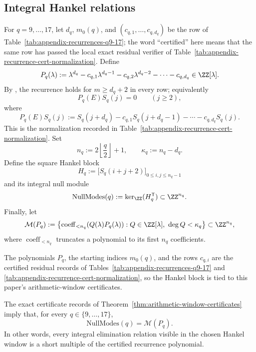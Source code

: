 \subsection{Integral Hankel relations}

\begin{definition}
\label{def:resonance-polynomials}
For \(q=9,\dots,17\), let \(d_q\), \(m_0(q)\), and
\((c_{q,1},\dots,c_{q,d_q})\) be the row of
Table~\ref{tab:appendix-recurrences-q9-17}; the word ``certified'' here means
that the same row has passed the local exact residual verifier of
Table~\ref{tab:appendix-recurrence-cert-normalization}.  Define
\[
  P_q(\lambda):=
  \lambda^{d_q}
  -c_{q,1}\lambda^{d_q-1}
  -c_{q,2}\lambda^{d_q-2}
  -\cdots
  -c_{q,d_q}\in\ZZ[\lambda].
\]
By , the recurrence holds for
\(m\ge d_q+2\) in every row; equivalently
\[
  P_q(E)S_q(j)=0\qquad(j\ge2),
\]
where
\[
  P_q(E)S_q(j):=
  S_q(j+d_q)-c_{q,1}S_q(j+d_q-1)-\cdots-c_{q,d_q}S_q(j).
\]
This is the normalization recorded in
Table~\ref{tab:appendix-recurrence-cert-normalization}.  Set
\[
  n_q:=2\left\lfloor\frac{q}{2}\right\rfloor+1,
  \qquad
  \kappa_q:=n_q-d_q.
\]
Define the square Hankel block
\[
  H_q:=\bigl[S_q(i+j+2)\bigr]_{0\le i,j\le n_q-1}
\]
and its integral null module
\[
  \mathrm{NullModes}(q):=\ker_{\ZZ}(H_q^{\mathsf T})\subset \ZZ^{n_q}.
\]
Finally, let
\[
  \mathcal M(P_q):=
  \bigl\{\operatorname{coeff}_{<n_q}(Q(\lambda)P_q(\lambda)):
  Q\in\ZZ[\lambda],\ \deg Q<\kappa_q\bigr\}\subset\ZZ^{n_q},
\]
where \(\operatorname{coeff}_{<n_q}\) truncates a polynomial to its first
\(n_q\) coefficients.
\end{definition}

\begin{remark}
The polynomials \(P_q\), the starting indices \(m_0(q)\), and the rows
\(c_{q,i}\) are the certified residual records of
Tables~\ref{tab:appendix-recurrences-q9-17} and
\ref{tab:appendix-recurrence-cert-normalization}, so the Hankel block is tied
to this paper's arithmetic-window certificates.
\end{remark}

\begin{theorem}
\label{thm:principalization}
The exact certificate records of
Theorem~\ref{thm:arithmetic-window-certificates} imply that, for every
\(q\in\{9,\dots,17\}\),
\[
  \mathrm{NullModes}(q)=\mathcal M(P_q).
\]
In other words, every integral elimination relation visible in the chosen
Hankel window is a short multiple of the certified recurrence polynomial.
\end{theorem}

